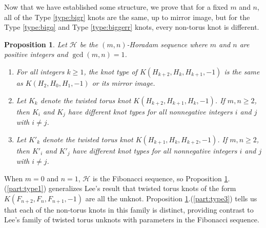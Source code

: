 \documentclass{amsart}
\newtheorem{proposition}{Proposition}
\begin{document}
%




Now that we have established some structure, we prove that for a fixed $m$ and $n$, all of the Type \ref{type:bigr} knots are the same, up to mirror image, but for the Type \ref{type:bigq} and Type \ref{type:biggerr} knots, every non-torus knot is different. 
\begin{proposition}\label{prop:knottypes}
Let $\mathcal H$ be the $(m,n)$-Horadam sequence where $m$ and $n$ are positive integers and $\gcd(m,n) = 1$.
\begin{enumerate}
\item\label{part:type1} For all integers $k\ge 1$, the knot type of $K(H_{k+2}, H_{k}, H_{k+1}, -1)$ is the same as $K(H_2, H_0, H_1, -1)$ or its mirror image.
\item\label{part:type3}  Let $K_k$ denote the twisted torus knot $K(H_{k+2}, H_{k+1}, H_{k}, -1)$. If $m, n \ge 2$, then $K_i$ and $K_j$ have different knot types for all nonnegative integers $i$ and $j$ with $i \neq j$. 
\item\label{part:type5} Let $K'_k$ denote the twisted torus knot $K(H_{k+1}, H_{k}, H_{k+2}, -1)$. If $m, n\ge 2$, then $K'_i$ and $K'_j$ have different knot types for all nonnegative integers $i$ and $j$ with $i \neq j$. 
\end{enumerate}
\end{proposition}


When $m=0$ and $n=1$, $\mathcal H$ is the Fibonacci sequence, so Proposition \ref{prop:knottypes}.(\ref{part:type1}) generalizes Lee's result \cite{LeeTTKUnknots} that twisted torus knots of the form $K(F_{n+2}, F_n, F_{n+1}, -1)$ are all the unknot.  
Proposition \ref{prop:knottypes}.(\ref{part:type3}) tells us that each of the non-torus knots in this family is distinct, providing contrast to Lee's \cite{LeeTTKUnknots} family of twisted torus unknots with parameters in the Fibonacci sequence.
\end{document}

